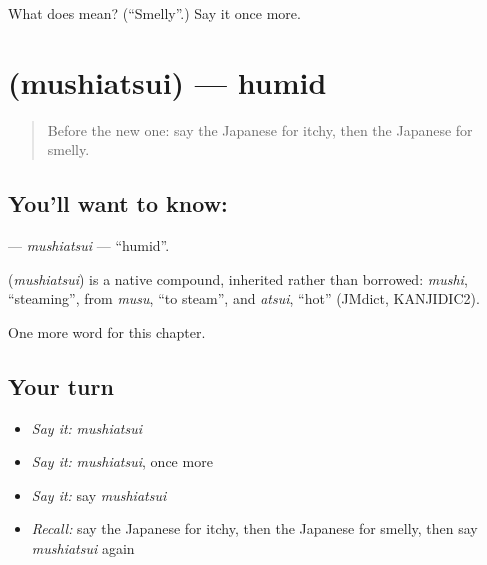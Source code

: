 \begin{tcolorbox}[breakable,colback=teal!4,colframe=teal!35!black,title={Before you move on}]
What does  mean? (\textquotedblleft{}Smelly\textquotedblright{}.) Say it once more.
\end{tcolorbox}
\section[\texorpdfstring{\ja{むしあつい} (mushiatsui)}{むしあつい (mushiatsui)}]{ (mushiatsui) — humid}

\label{lesson:JA-C124-mushiatsui}



\begin{quote}
Before the new one: say the Japanese for itchy, then the Japanese for smelly.
\end{quote}

\subsection*{You'll want to know: }
\textbf{} — \emph{mushiatsui} — \textquotedblleft{}humid\textquotedblright{}.

\begin{cousinweb}
\textbf{} (\emph{mushiatsui}) is a native compound, inherited rather than borrowed: \emph{mushi}, \textquotedblleft{}steaming\textquotedblright{}, from \emph{musu}, \textquotedblleft{}to steam\textquotedblright{}, and \emph{atsui}, \textquotedblleft{}hot\textquotedblright{} (JMdict, KANJIDIC2).
\end{cousinweb}

\begin{grammarlens}[title={What you've built}]
One more word for this chapter.
\end{grammarlens}

\subsection*{Your turn}
\begin{itemize}
\raggedright
  \item \emph{Say it:} \emph{mushiatsui}
  \item \emph{Say it:} \emph{mushiatsui}, once more
  \item \emph{Say it:} say \emph{mushiatsui}
  \item \emph{Recall:} say the Japanese for itchy, then the Japanese for smelly, then say \emph{mushiatsui} again
\end{itemize}

